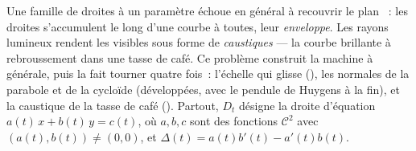 \begin{problem}\label{pb:b2:curves:1}
Une famille de droites à un paramètre échoue en général à
recouvrir le plan ~: les droites s'accumulent le long
d'une courbe  à toutes, leur \emph{enveloppe}.
Les rayons lumineux
rendent les  visibles sous forme de \emph{caustiques}
--- la courbe brillante à rebroussement dans une tasse de café. Ce
problème construit la machine à  générale, puis la fait
tourner quatre fois~: l'échelle qui glisse (), les
normales de la parabole et de la cycloïde (développées, avec le
pendule de Huygens à la fin), et la caustique de la tasse de café
(). Partout, $D_t$ désigne la droite d'équation
$a(t)\,x + b(t)\,y = c(t)$, où $a, b, c$
sont des fonctions $\mathcal C^2$ avec $(a(t), b(t)) \neq (0,0)$,
et $\Delta(t) = a(t)b'(t) - a'(t)b(t)$.


\end{problem}

